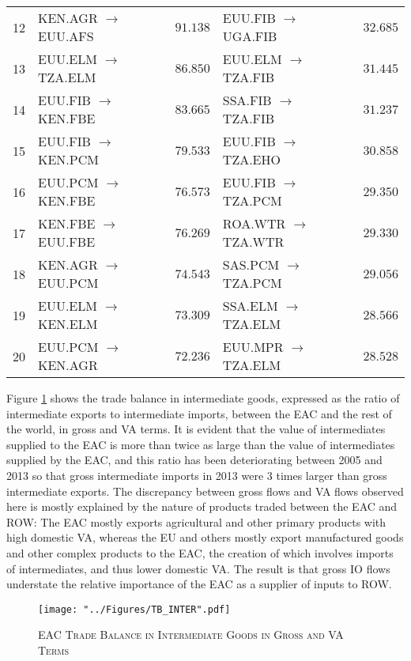 \documentclass[a4paper]{article}
\begin{document}
\begin{table}[!htbp]
\begin{tabular}{rlrlr}
12 & KEN.AGR $\to$  EUU.AFS & $91.138$ & EUU.FIB $\to$  UGA.FIB & $32.685$ \\ 
13 & EUU.ELM $\to$  TZA.ELM & $86.850$ & EUU.ELM $\to$  TZA.FIB & $31.445$ \\ 
14 & EUU.FIB $\to$  KEN.FBE & $83.665$ & SSA.FIB $\to$  TZA.FIB & $31.237$ \\ 
15 & EUU.FIB $\to$  KEN.PCM & $79.533$ & EUU.FIB $\to$  TZA.EHO & $30.858$ \\ 
16 & EUU.PCM $\to$  KEN.FBE & $76.573$ & EUU.FIB $\to$  TZA.PCM & $29.350$ \\ 
17 & KEN.FBE $\to$  EUU.FBE & $76.269$ & ROA.WTR $\to$  TZA.WTR & $29.330$ \\ 
18 & KEN.AGR $\to$  EUU.PCM & $74.543$ & SAS.PCM $\to$  TZA.PCM & $29.056$ \\ 
19 & EUU.ELM $\to$  KEN.ELM & $73.309$ & SSA.ELM $\to$  TZA.ELM & $28.566$ \\ 
20 & EUU.PCM $\to$  KEN.AGR & $72.236$ & EUU.MPR $\to$  TZA.ELM & $28.528$ \\ 
\bottomrule
\end{tabular} 
\end{table} 
\FloatBarrier

Figure \ref{fig:TBint} shows the trade balance in intermediate goods, expressed as the ratio of intermediate exports to intermediate imports, between the EAC and the rest of the world, in gross and VA terms. It is evident that the value of intermediates supplied to the EAC is more than twice as large than the value of intermediates supplied by the EAC, and this ratio has been deteriorating between 2005 and 2013 so that gross intermediate imports in 2013 were 3 times larger than gross intermediate exports. The discrepancy between gross flows and VA flows observed here is mostly explained by the nature of products traded between the EAC and ROW: The EAC mostly exports agricultural and other primary products with high domestic VA, whereas the EU and others mostly export manufactured goods and other complex products to the EAC, the creation of which involves imports of intermediates, and thus lower domestic VA. The result is that gross IO flows understate the relative importance of the EAC as a supplier of inputs to ROW.

\begin{figure}[h!]
\centering
\caption{\label{fig:TBint}\textsc{EAC Trade Balance in Intermediate Goods in Gross and VA Terms}}
\texttt{[image: "../Figures/TB\_INTER".pdf]} %
\end{figure}
\FloatBarrier
\end{document}
